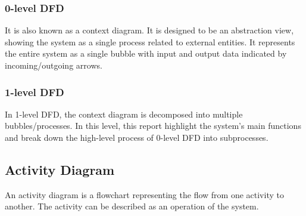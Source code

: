 \documentclass[a4paper,12pt]{report}
\begin{document}
\subsubsection{0-level DFD}
It is also known as a context diagram. It is designed to be an abstraction view, showing the system as a single process related to external entities. It represents the entire system as a single bubble with input and output data indicated by incoming/outgoing arrows.
\subsubsection{1-level DFD}
In 1-level DFD, the context diagram is decomposed into multiple bubbles/processes. In this level, this report highlight the system's main functions and break down the high-level process of 0-level DFD into subprocesses.
\subsection{Activity Diagram}
An activity diagram is a flowchart representing the flow from one activity to another. The activity can be described as an operation of the system.
\end{document}

